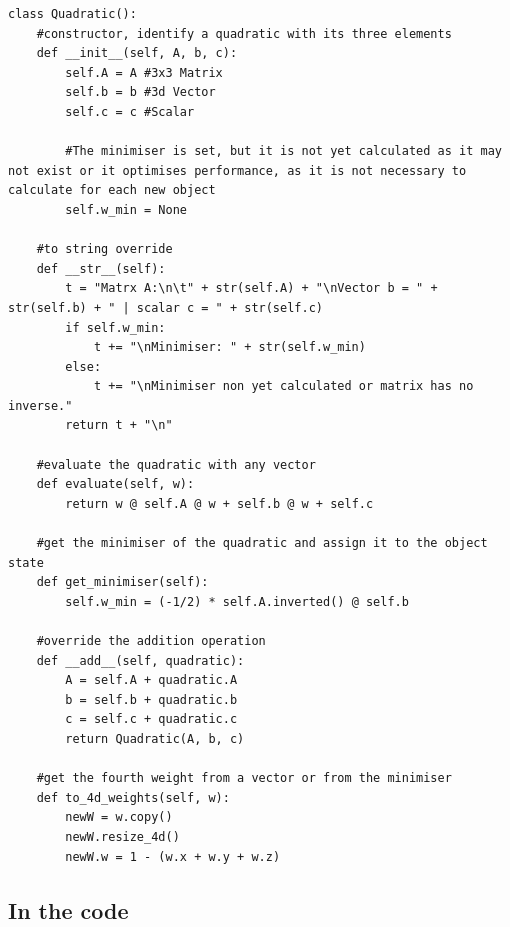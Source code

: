 \documentclass[12pt,twoside]{report}
\begin{document}
\begin{lstlisting}
class Quadratic():
    #constructor, identify a quadratic with its three elements
    def __init__(self, A, b, c):
        self.A = A #3x3 Matrix
        self.b = b #3d Vector
        self.c = c #Scalar
        
        #The minimiser is set, but it is not yet calculated as it may not exist or it optimises performance, as it is not necessary to calculate for each new object
        self.w_min = None

    #to string override
    def __str__(self):
        t = "Matrx A:\n\t" + str(self.A) + "\nVector b = " + str(self.b) + " | scalar c = " + str(self.c)
        if self.w_min:
            t += "\nMinimiser: " + str(self.w_min)
        else:
            t += "\nMinimiser non yet calculated or matrix has no inverse."
        return t + "\n"
    
    #evaluate the quadratic with any vector
    def evaluate(self, w):
        return w @ self.A @ w + self.b @ w + self.c
    
    #get the minimiser of the quadratic and assign it to the object state
    def get_minimiser(self):
        self.w_min = (-1/2) * self.A.inverted() @ self.b

    #override the addition operation
    def __add__(self, quadratic):
        A = self.A + quadratic.A
        b = self.b + quadratic.b
        c = self.c + quadratic.c
        return Quadratic(A, b, c)

    #get the fourth weight from a vector or from the minimiser
    def to_4d_weights(self, w):
        newW = w.copy()
        newW.resize_4d()
        newW.w = 1 - (w.x + w.y + w.z)
\end{lstlisting}

\subsection{In the code}
\end{document}
